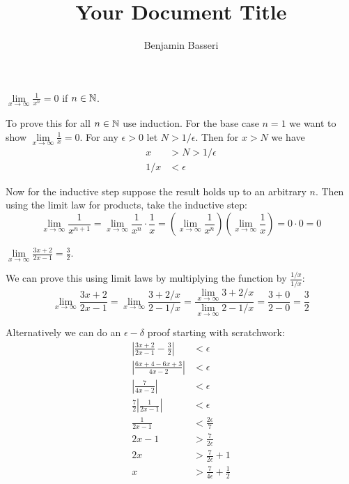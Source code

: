 \documentclass{article}
\title{Your Document Title}
\author{Benjamin Basseri}
\begin{document}
\maketitle
\begin{problem}
$\lim\limits_{x\to \infty} \frac{1}{x^n} = 0$ if $n \in \mathbb{N}$.
\end{problem}

To prove this for all $n\in\mathbb{N}$ use induction. For the base case $n=1$ we want to show $\lim\limits_{x\to\infty} \frac{1}{x} = 0$. For any $\epsilon > 0$ let $N > 1/\epsilon$. Then for $x > N$ we have
\begin{align*}
  x   & > N > 1/\epsilon \\
  1/x & < \epsilon
\end{align*}

Now for the inductive step suppose the result holds up to an arbitrary $n$. Then using the limit law for products, take the inductive step:
$$\lim_{x\to\infty} \frac{1}{x^{n+1}} = \lim_{x\to\infty} \frac{1}{x^n} \cdot \frac{1}{x} = \left(\lim_{x\to\infty} \frac{1}{x^n}\right)\left(\lim_{x \to \infty} \frac{1}{x}\right) = 0 \cdot 0 = 0$$

\begin{problem}
$\lim\limits_{x\to\infty} \frac{3x + 2}{2x - 1} = \frac{3}{2}$.
\end{problem}

We can prove this using limit laws by multiplying the function by $\frac{1/x}{1/x}$:
$$\lim_{x\to\infty} \frac{3x + 2}{2x - 1} = \lim_{x\to\infty} \frac{3 + 2/x}{2 - 1/x} = \frac{\lim_{x\to\infty} 3 + 2/x}{\lim_{x\to\infty} 2 - 1/x} = \frac{3 + 0}{2 - 0} = \frac{3}{2}$$

Alternatively we can do an $\epsilon-\delta$ proof starting with scratchwork:
\begin{align*}
  \left|\frac{3x + 2}{2x - 1} - \frac{3}{2}\right| & < \epsilon                          \\
  \left|\frac{6x + 4 - 6x + 3}{4x - 2}\right|      & < \epsilon                          \\
  \left|\frac{7}{4x - 2}\right|                    & < \epsilon                          \\
  \frac{7}{2}\left|\frac{1}{2x - 1}\right|         & < \epsilon                          \\
  \frac{1}{2x - 1}                                 & < \frac{2\epsilon}{7}               \\
  2x - 1                                           & > \frac{7}{2\epsilon}               \\
  2x                                               & > \frac{7}{2\epsilon}+1             \\
  x                                                & > \frac{7}{4\epsilon} + \frac{1}{2}
\end{align*}
\end{document}
